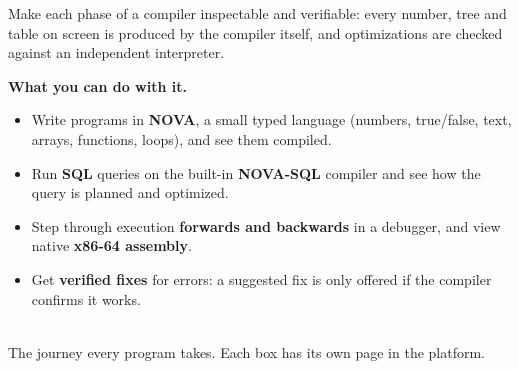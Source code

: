 \documentclass[12pt,a4paper]{article}
\begin{document}
\begin{aim}
Make each phase of a compiler inspectable and verifiable: every number, tree and table on screen is produced by the compiler itself, and optimizations are checked against an independent interpreter.
\end{aim}

\textbf{What you can do with it.}
\begin{itemize}
\item Write programs in \textbf{NOVA}, a small typed language (numbers, true/false, text, arrays, functions, loops), and see them compiled.
\item Run \textbf{SQL} queries on the built-in \textbf{NOVA-SQL} compiler and see how the query is planned and optimized.
\item Step through execution \textbf{forwards and backwards} in a debugger, and view native \textbf{x86-64 assembly}.
\item Get \textbf{verified fixes} for errors: a suggested fix is only offered if the compiler confirms it works.
\end{itemize}

\begin{center}
\\[2pt]{\scriptsize\color{slate}The journey every program takes. Each box has its own page in the platform.}
\end{center}
\end{document}
